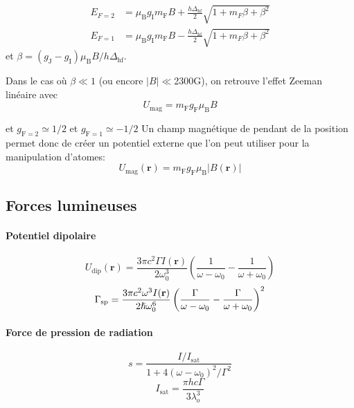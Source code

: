 \begin{equation}
\begin{aligned}
E_{F=2} &=\mu_{\mathrm{B}} g_{\mathrm{I}} m_{\mathrm{F}} B + \frac{h \Delta_{\mathrm{hf}}}{2} \sqrt{1+ m_F \beta +\beta^2} \\
E_{F=1} &=\mu_{\mathrm{B}} g_{\mathrm{I}} m_{\mathrm{F}} B - \frac{h \Delta_{\mathrm{hf}}}{2} \sqrt{1+ m_F \beta +\beta^2}
\end{aligned}
\end{equation}
et $\beta=(g_{\mathrm{J}}-g_{\mathrm{I}}) \mu_{\mathrm{B}} B/h \Delta_{\mathrm{hf}}$.

Dans le cas où $\beta \ll 1$ (ou encore $\left| B \right| \ll$2300G), on retrouve l'effet Zeeman linéaire avec 
\begin{equation}
U_{\mathrm{mag}}=m_{\mathrm{F}} g_{\mathrm{F}} \mu_{\mathrm{B}} B
\end{equation}

et $g_{\mathrm{F}=2} \simeq 1/2$ et $g_{\mathrm{F}=1} \simeq -1/2$
Un champ magnétique de pendant de la position permet donc de créer un potentiel externe que l'on peut utiliser pour la manipulation d'atomes:
\begin{equation}
U_{\mathrm{mag}} (\mathbf{r}) = m_{\mathrm{F}} g_{\mathrm{F}} \mu_{\mathrm{B}} \left| B(\mathbf{r}) \right|
\end{equation}

\subsection{Forces lumineuses}
\paragraph*{Potentiel dipolaire}
\begin{equation}
U_{\mathrm{dip}}(\mathbf{r})=\frac{3\pi c^2 \Gamma I(\mathbf{r})}{2 \omega_0^3} \left( \frac{1}{\omega - \omega_0} - \frac{1}{\omega + \omega_0} \right)
\end{equation}
\begin{equation}
\Gamma_{\mathrm{sp}}=\frac{3 \pi c^2 \omega^3 I(\mathbf{r})}{2\hslash \omega_0^6} \left( \frac{\Gamma}{\omega-\omega_0}-\frac{\Gamma}{\omega+\omega_0} \right)^2
\end{equation}

\paragraph*{Force de pression de radiation}
\begin{equation}
s=\frac{I/I_{\mathrm{sat}}}{1+4(\omega-\omega_0)^2/\Gamma^2}
\end{equation}
\begin{equation}
I_{\mathrm{sat}}=\frac{\pi h c \Gamma}{3\lambda_o^3}
\end{equation}

